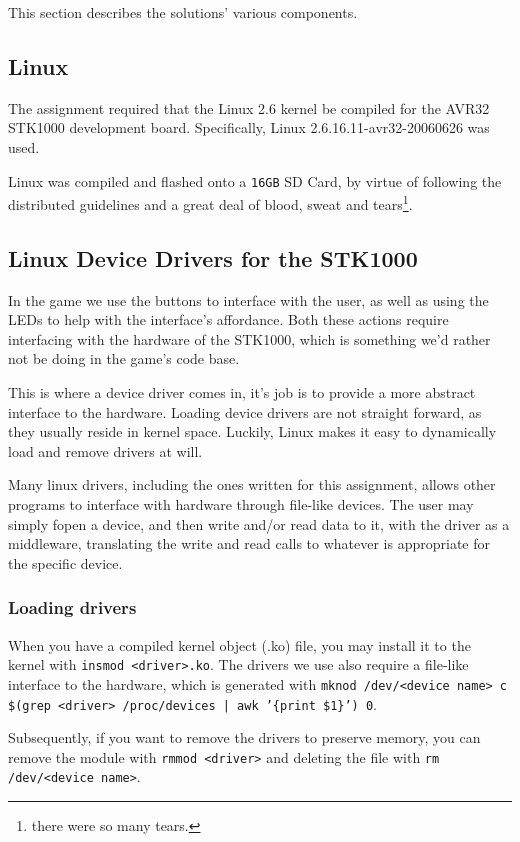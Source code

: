 This section describes the solutions' various components.

\subsection{Linux}
The assignment required that the Linux 2.6 kernel be compiled for the AVR32 STK1000 development board.
Specifically, Linux 2.6.16.11-avr32-20060626 was used.

Linux was compiled and flashed onto a \texttt{16GB} SD Card, by virtue of following the distributed guidelines and a great deal of blood, sweat and tears\footnote{there were so many tears.}.

\subsection{Linux Device Drivers for the STK1000}
In the game we use the buttons to interface with the user, as well as using the LEDs to help with the interface's affordance.
Both these actions require interfacing with the hardware of the STK1000, which is something we'd rather not be doing in the game's code base.

This is where a device driver comes in, it's job is to provide a more abstract interface to the hardware.
Loading device drivers are not straight forward, as they usually reside in kernel space.
Luckily, Linux makes it easy to dynamically load and remove drivers at will.

Many linux drivers, including the ones written for this assignment, allows other programs to interface with hardware through file-like devices.
The user may simply fopen a device, and then write and/or read data to it, with the driver as a middleware, translating the write and read calls to whatever is appropriate for the specific device.

\subsubsection{Loading drivers}
When you have a compiled kernel object (.ko) file, you may install it to the kernel with \texttt{insmod <driver>.ko}.
The drivers we use also require a file-like interface to the hardware, which is generated with \texttt{mknod /dev/<device name> c \$(grep <driver> /proc/devices | awk '\{print \$1\}') 0}.

Subsequently, if you want to remove the drivers to preserve memory, you can remove the module with \texttt{rmmod <driver>} and deleting the file with \texttt{rm /dev/<device name>}.

